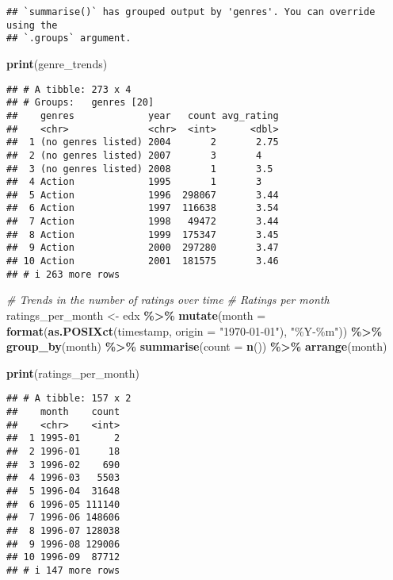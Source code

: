 \documentclass[
]{article}
\newenvironment{Shaded}{\begin{snugshade}}{\end{snugshade}}
\newcommand{\AttributeTok}[1]{\textcolor[rgb]{0.13,0.29,0.53}{#1}}
\newcommand{\CommentTok}[1]{\textcolor[rgb]{0.56,0.35,0.01}{\textit{#1}}}
\newcommand{\FunctionTok}[1]{\textcolor[rgb]{0.13,0.29,0.53}{\textbf{#1}}}
\newcommand{\NormalTok}[1]{#1}
\newcommand{\OtherTok}[1]{\textcolor[rgb]{0.56,0.35,0.01}{#1}}
\newcommand{\SpecialCharTok}[1]{\textcolor[rgb]{0.81,0.36,0.00}{\textbf{#1}}}
\newcommand{\StringTok}[1]{\textcolor[rgb]{0.31,0.60,0.02}{#1}}
\begin{document}
\begin{verbatim}
## `summarise()` has grouped output by 'genres'. You can override using the
## `.groups` argument.
\end{verbatim}

\begin{Shaded}
\begin{Highlighting}[]
\FunctionTok{print}\NormalTok{(genre\_trends)}
\end{Highlighting}
\end{Shaded}

\begin{verbatim}
## # A tibble: 273 x 4
## # Groups:   genres [20]
##    genres             year   count avg_rating
##    <chr>              <chr>  <int>      <dbl>
##  1 (no genres listed) 2004       2       2.75
##  2 (no genres listed) 2007       3       4   
##  3 (no genres listed) 2008       1       3.5 
##  4 Action             1995       1       3   
##  5 Action             1996  298067       3.44
##  6 Action             1997  116638       3.54
##  7 Action             1998   49472       3.44
##  8 Action             1999  175347       3.45
##  9 Action             2000  297280       3.47
## 10 Action             2001  181575       3.46
## # i 263 more rows
\end{verbatim}

\begin{Shaded}
\begin{Highlighting}[]
\CommentTok{\# Trends in the number of ratings over time}
\CommentTok{\# Ratings per month}
\NormalTok{ratings\_per\_month }\OtherTok{\textless{}{-}}\NormalTok{ edx }\SpecialCharTok{\%\textgreater{}\%}
  \FunctionTok{mutate}\NormalTok{(}\AttributeTok{month =} \FunctionTok{format}\NormalTok{(}\FunctionTok{as.POSIXct}\NormalTok{(timestamp, }\AttributeTok{origin =} \StringTok{"1970{-}01{-}01"}\NormalTok{), }\StringTok{"\%Y{-}\%m"}\NormalTok{)) }\SpecialCharTok{\%\textgreater{}\%}
  \FunctionTok{group\_by}\NormalTok{(month) }\SpecialCharTok{\%\textgreater{}\%}
  \FunctionTok{summarise}\NormalTok{(}\AttributeTok{count =} \FunctionTok{n}\NormalTok{()) }\SpecialCharTok{\%\textgreater{}\%}
  \FunctionTok{arrange}\NormalTok{(month)}

\FunctionTok{print}\NormalTok{(ratings\_per\_month)}
\end{Highlighting}
\end{Shaded}

\begin{verbatim}
## # A tibble: 157 x 2
##    month    count
##    <chr>    <int>
##  1 1995-01      2
##  2 1996-01     18
##  3 1996-02    690
##  4 1996-03   5503
##  5 1996-04  31648
##  6 1996-05 111140
##  7 1996-06 148606
##  8 1996-07 128038
##  9 1996-08 129006
## 10 1996-09  87712
## # i 147 more rows
\end{verbatim}
\end{document}

